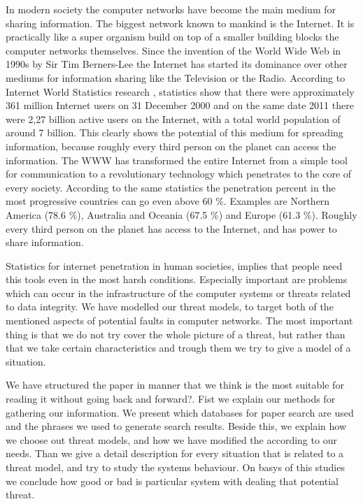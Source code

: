 In modern society the computer networks have become the main medium for sharing information. The  biggest network known to mankind is the Internet. It is practically like a super organism build on top of a smaller building blocks the computer networks themselves. Since the invention of the World Wide Web in 1990s by Sir Tim Berners-Lee \cite{web:timbernerslee} the Internet has started its dominance over other mediums for information sharing like the Television or the Radio. According to Internet World Statistics research \cite{web:internetworldstats}, statistics show that there were approximately 361 million Internet users on 31 December 2000 and on the same date 2011 there were 2,27 billion active users on the Internet, with a total world population of around 7 billion. This clearly shows the potential of this medium for spreading information, because roughly every third person on the planet can access the information. The WWW has transformed the entire Internet from a simple tool for communication to a revolutionary technology which penetrates to the core of every society. According to the same statistics \cite{web:internetworldstats} the penetration percent in the most progressive countries can go even above 60 \%. Examples are Northern America (78.6 \%), Australia and Oceania (67.5 \%) and Europe (61.3 \%). Roughly every third person on the planet has access to the Internet, and has power to share information. 

Statistics for internet penetration in human societies, implies that people need this tools even in the most harsh conditions. Especially important are problems which can occur in the infrastructure of the computer systems or threats related to data integrity. We have modelled our threat models, to target both of the mentioned aspects of potential faults in computer networks. The most important thing is that we do not try cover the whole picture of a threat, but rather than that we take certain characteristics and trough them we try to give a model of a situation.

We have structured the paper in manner that we think is the most suitable for reading it without going back and forward?. Fist we explain our methods for gathering our information. We present which databases for paper search are used and the phrases we used to generate search results. Beside this, we explain how we choose out threat models, and how we have modified the according to our needs. Than we give a detail description for every situation that is related to a threat model, and try to study the systems behaviour. On basys of this studies we conclude how good or bad is particular system with dealing that potential threat.
 
